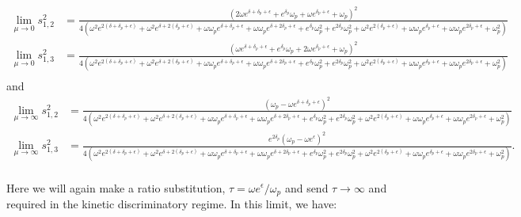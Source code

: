 \begin{widetext}
\begin{eqnarray*}
\lim_{\mu\to0}{s^2_{1,2}}&=\frac{\left(2 \omega  e^{\delta +\delta_p+\epsilon }+e^{\delta_p} \omega_p+\omega  e^{\delta_p+\epsilon }+\omega_p\right)^2}{4 \left(\omega ^2 e^{2 (\delta +\delta_p+\epsilon )}+\omega ^2 e^{\delta +2 (\delta_p+\epsilon )}+\omega  \omega_p e^{\delta +\delta_p+\epsilon }+\omega  \omega_p e^{\delta +2 \delta_p+\epsilon }+e^{\delta_p} \omega_p^2+e^{2 \delta_p} \omega_p^2+\omega ^2 e^{2 (\delta_p+\epsilon )}+\omega  \omega_p e^{\delta_p+\epsilon }+\omega  \omega_p e^{2 \delta_p+\epsilon }+\omega_p^2\right)}\\
\lim_{\mu\to0}{s^2_{1,3}}&=\frac{\left(\omega  e^{\delta +\delta_p+\epsilon }+e^{\delta_p} \omega_p+2 \omega  e^{\delta_p+\epsilon }+\omega_p\right)^2}{4 \left(\omega ^2 e^{2 (\delta +\delta_p+\epsilon )}+\omega ^2 e^{\delta +2 (\delta_p+\epsilon )}+\omega  \omega_p e^{\delta +\delta_p+\epsilon }+\omega  \omega_p e^{\delta +2 \delta_p+\epsilon }+e^{\delta_p} \omega_p^2+e^{2 \delta_p} \omega_p^2+\omega ^2 e^{2 (\delta_p+\epsilon )}+\omega  \omega_p e^{\delta_p+\epsilon }+\omega  \omega_p e^{2 \delta_p+\epsilon }+\omega_p^2\right)}\\
\end{eqnarray*}
and
\begin{eqnarray*}
\lim_{\mu\to\infty}{s^2_{1,2}}&=\frac{\left(\omega_p-\omega  e^{\delta +\delta_p+\epsilon }\right)^2}{4 \left(\omega ^2 e^{2 (\delta +\delta_p+\epsilon )}+\omega ^2 e^{\delta +2 (\delta_p+\epsilon )}+\omega  \omega_p e^{\delta +\delta_p+\epsilon }+\omega  \omega_p e^{\delta +2 \delta_p+\epsilon }+e^{\delta_p} \omega_p^2+e^{2 \delta_p} \omega_p^2+\omega ^2 e^{2 (\delta_p+\epsilon )}+\omega  \omega_p e^{\delta_p+\epsilon }+\omega  \omega_p e^{2 \delta_p+\epsilon }+\omega_p^2\right)}\\
\lim_{\mu\to\infty}{s^2_{1,3}}&=\frac{e^{2 \delta_p} \left(\omega_p-\omega  e^{\epsilon }\right)^2}{4 \left(\omega ^2 e^{2 (\delta +\delta_p+\epsilon )}+\omega ^2 e^{\delta +2 (\delta_p+\epsilon )}+\omega  \omega_p e^{\delta +\delta_p+\epsilon }+\omega  \omega_p e^{\delta +2 \delta_p+\epsilon }+e^{\delta_p} \omega_p^2+e^{2 \delta_p} \omega_p^2+\omega ^2 e^{2 (\delta_p+\epsilon )}+\omega  \omega_p e^{\delta_p+\epsilon }+\omega  \omega_p e^{2 \delta_p+\epsilon }+\omega_p^2\right)}.\\
\end{eqnarray*}
\end{widetext}
Here we will again make a ratio substitution, $\tau=\omega e^{\epsilon}/\omega_p$ and send $\tau\to\infty$ and required in the kinetic discriminatory regime.  In this limit, we have: %
